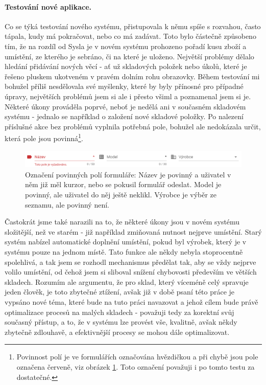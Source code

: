 \paragraph{Testování nové aplikace.} Co se týká testování nového systému, přistupovala k němu spíše s rozvahou, často tápala, kudy má pokračovat, nebo co má zadávat. Toto bylo částečně způsobeno tím, že na rozdíl od Sysla je v novém systému prohozeno pořadí  kusu zboží a umístění, ze kterého je sebráno, či na které je uloženo. Největší problémy dělalo hledání přidávání nových věcí - ať už skladových položek nebo úkolů, které je řešeno pluskem ukotveném v pravém dolním rohu obrazovky. Během testování mi bohužel příliš nesdělovala své myšlenky, které by byly přínosné pro případné úpravy, největších problémů jsem si ale i přesto všiml a poznamenal jsem si je.\\
Některé úkony prováděla poprvé, neboť je nedělá ani v současném skladovém systému - jednalo se například o založení nové skladové položky. Po nalezení příslušné akce bez problémů vyplnila potřebná pole, bohužel ale nedokázala určit, která pole jsou povinná\footnote{Povinnost polí je ve formulářích označována hvězdičkou a při chybě jsou pole označena červeně, viz obrázek \ref{picture:test:required_fields}. Toto označení považuji i po tomto testu za dostatečné.}.\\

\begin{figure}[h]
\includegraphics[width=\textwidth]{../png/app_testing/required_fields.png}
\caption[Označení povinných polí formuláře]{Označení povinných polí formuláře: Název je povinný a uživatel v něm již měl kurzor, nebo se pokusil formulář odeslat. Model je povinný, ale uživatel do něj ještě neklikl. Výrobce je výběr ze seznamu, ale povinný není.} \label{picture:test:required_fields}
\end{figure}

Častokrát jsme také narazili na to, že některé úkony jsou v novém systému složitější, než ve starém - již například zmiňovaná nutnost nejprve  umístění. Starý systém nabízel automatické doplnění umístění, pokud byl  výrobek, který je v systému pouze na jednom místě. Tato funkce ale někdy nebyla stoprocentně spolehlivá, a tak jsem se rozhodl mechanismus předělat tak, aby se vždy nejprve volilo umístění, od čehož jsem si sliboval snížení chybovosti především ve větších skladech. Rozumím ale argumentu, že pro sklad, který víceméně celý spravuje jeden člověk, je toto zbytečné ztížení, avšak již v době psaní této práce je vypsáno nové téma, které bude na tuto práci navazovat a jehož cílem bude právě optimalizace procesů na malých skladech - považuji tedy za korektní svůj současný přístup, a to, že v systému lze provést vše, kvalitně, avšak někdy zbytečně zdlouhavě, a efektivnější procesy se mohou dále optimalizovat.

